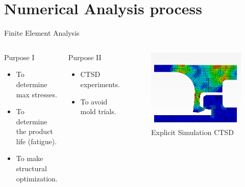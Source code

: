 \documentclass[10pt]{beamer}
\begin{document}
\section{Numerical Analysis process}
\begin{frame}[fragile]{Finite Element Analysis}
\begin{columns}[T,onlytextwidth]
	\begin{block}{Purpose I}
	\begin{itemize}
		\item {To determine max stresses.}
		\item {To determine the product life (fatigue).}
		\item {To make structural optimization.}
	\end{itemize}
	\end{block}
	\begin{block}{Purpose II}
	\begin{itemize}
		\item {CTSD experiments.}
		\item {To avoid mold trials.}
	\end{itemize}
	\end{block}
	\begin{figure}
	\vspace{1cm}
	\includegraphics[scale=0.25]{CTSDsimulation}
	\caption{Explicit Simulation CTSD}
	\end{figure}
\end{columns}
\end{frame}
\end{document}
